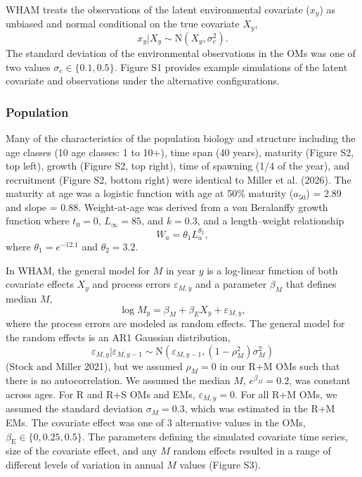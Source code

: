 \documentclass[
  12pt,
]{article}
\begin{document}
WHAM treats the observations of the latent environmental covariate
(\(x_y\)) as unbiased and normal conditional on the true covariate
\(X_y\), \[
x_y|X_y \sim \text{N}\left(X_y,\sigma^2_e\right).
\] The standard deviation of the environmental observations in the OMs
was one of two values \(\sigma_e \in \{0.1, 0.5\}\). Figure S1 provides
example simulations of the latent covariate and observations under the
alternative configurations.

\subsubsection*{Population}\label{population}

Many of the characteristics of the population biology and structure
including the age classes (10 age classes: 1 to 10+), time span (40
years), maturity (Figure S2, top left), growth (Figure S2, top right),
time of spawning (1/4 of the year), and recruitment (Figure S2, bottom
right) were identical to Miller et al. (2026). The maturity at age was a
logistic function with age at 50\% maturity (\(a_{50}\)) = 2.89 and
slope = 0.88. Weight-at-age was derived from a von Beralanffy growth
function where \(t_0 = 0\), \(L_\infty = 85\), and \(k = 0.3\), and a
length--weight relationship \[
W_a = \theta_1 L_a^{\theta_2},
\] where \(\theta_1 = e^{-12.1}\) and \(\theta_2 = 3.2\).

In WHAM, the general model for \(M\) in year \(y\) is a log-linear
function of both covariate effects \(X_y\) and process errors
\(\varepsilon_{M,y}\) and a parameter \(\beta_{M}\) that defines median
\(M\), \[
\log M_y = \beta_M + \beta_{E} X_y + \varepsilon_{M,y},
\] where the process errors are modeled as random effects. The general
model for the random effects is an AR1 Gaussian distribution, \[
\varepsilon_{M,y}|\varepsilon_{M,y-1} \sim \text{N}\left(\varepsilon_{M,y-1},(1-\rho_M^2)\sigma_M^2\right)
\] (Stock and Miller 2021), but we assumed \(\rho_M = 0\) in our R+M OMs
such that there is no autocorrelation. We assumed the median \(M\),
\(e^{\beta_M} = 0.2\), was constant across ages. For R and R+S OMs and
EMs, \(\varepsilon_{M,y} = 0\). For all R+M OMs, we assumed the standard
deviation \(\sigma_M = 0.3\), which was estimated in the R+M EMs. The
covariate effect was one of 3 alternative values in the OMs,
\(\beta_\text{E} \in \{0,0.25,0.5\}\). The parameters defining the
simulated covariate time series, size of the covariate effect, and any
\(M\) random effects resulted in a range of different levels of
variation in annual \(M\) values (Figure S3).
\end{document}

